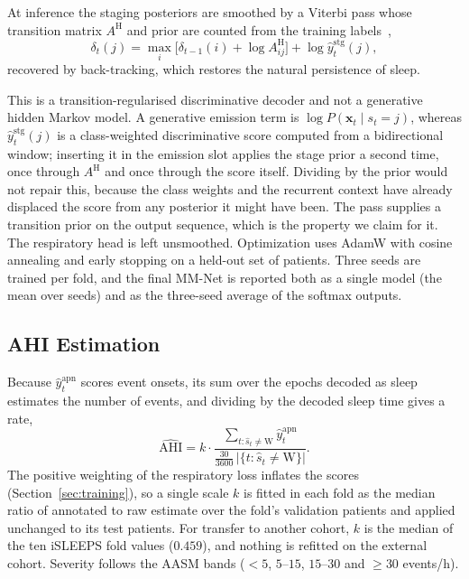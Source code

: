 \documentclass{ieeeaccess}
\begin{document}
At inference the staging
posteriors are smoothed by a Viterbi pass whose transition matrix $A^{\mathrm H}$
and prior are counted from the training labels~\cite{chen2024hmm},
\begin{equation}
\delta_t(j)=\max_i\big[\delta_{t-1}(i)+\log A^{\mathrm H}_{ij}\big]+\log\hat y^{\mathrm{stg}}_t(j),
\end{equation}
recovered by back-tracking, which restores the natural persistence of sleep.

This is a transition-regularised discriminative decoder and not a generative hidden Markov
model. A generative emission term is
$\log P(\mathbf{x}_t\mid s_t=j)$, whereas $\hat y^{\mathrm{stg}}_t(j)$ is a class-weighted
discriminative score computed from a bidirectional window; inserting it in the emission slot
applies the stage prior a second time, once through $A^{\mathrm H}$ and once through the
score itself. Dividing by the prior would not repair this, because the class weights and the
recurrent context have already displaced the score from any posterior it might have been.
The pass supplies a transition prior on the output sequence, which is the property we claim
for it. The respiratory
head is left unsmoothed. Optimization uses AdamW with cosine annealing and early stopping on a
held-out set of patients. Three seeds are trained per fold, and the final MM-Net is reported
both as a single model (the mean over seeds) and as the three-seed average of the softmax
outputs.

\subsection{AHI Estimation}
\label{sec:ahimethod}
Because $\hat y^{\mathrm{apn}}_t$ scores event onsets, its sum over the epochs decoded as sleep
estimates the number of events, and dividing by the decoded sleep time gives a rate,
\begin{equation}
\widehat{\mathrm{AHI}}=k\cdot\frac{\sum_{t:\hat s_t\neq\mathrm{W}}\hat y^{\mathrm{apn}}_t}{\tfrac{30}{3600}\,\lvert\{t:\hat s_t\neq\mathrm{W}\}\rvert}.
\end{equation}
The positive weighting of the respiratory loss inflates the scores
(Section~\ref{sec:training}), so a single scale $k$ is fitted in each fold as the median ratio
of annotated to raw estimate over the fold's validation patients and applied unchanged to its
test patients. For transfer to another cohort, $k$ is the median of the ten iSLEEPS fold
values ($0.459$), and nothing is refitted on the external cohort. Severity follows the AASM
bands ($<5$, $5$--$15$, $15$--$30$ and $\geq30$ events/h).
\end{document}
